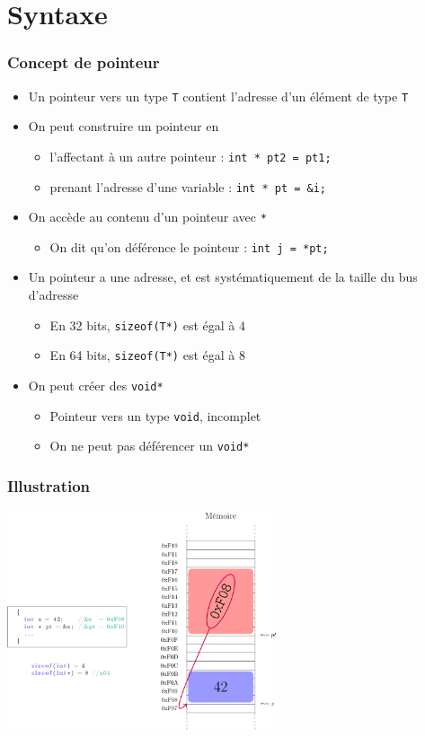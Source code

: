 \section{Syntaxe}

\begin{frame}
\frametitle{Concept de pointeur}
\begin{itemize}[<+->]
\item Un pointeur vers un type \texttt{T} contient l'adresse d'un élément de type \texttt{T}
\item On peut construire un pointeur en
	\begin{itemize}
	\item l'affectant à un autre pointeur : \lstinline|int * pt2 = pt1;|
	\item prenant l'adresse d'une variable : \lstinline|int * pt = &i;|
	\end{itemize}
\item On accède au contenu d'un pointeur avec \texttt{*}
	\begin{itemize}
	\item On dit qu'on déférence le pointeur : \lstinline|int j = *pt;|
	\end{itemize}
\item Un pointeur a une adresse, et est systématiquement de la taille du bus d'adresse
	\begin{itemize}
	\item En 32 bits, \lstinline|sizeof(T*)| est égal à $4$
	\item En 64 bits, \lstinline|sizeof(T*)| est égal à $8$
	\end{itemize}
\item On peut créer des \lstinline|void*|
	\begin{itemize}
	\item Pointeur vers un type \lstinline|void|, incomplet	
	\item On ne peut pas déférencer un \lstinline|void*|
	\end{itemize}
\end{itemize}
\end{frame}

\begin{frame}
\frametitle{Illustration}
\begin{center}
\includegraphics[width=8cm]{pics/ptr.pdf}
\end{center}
\end{frame}

